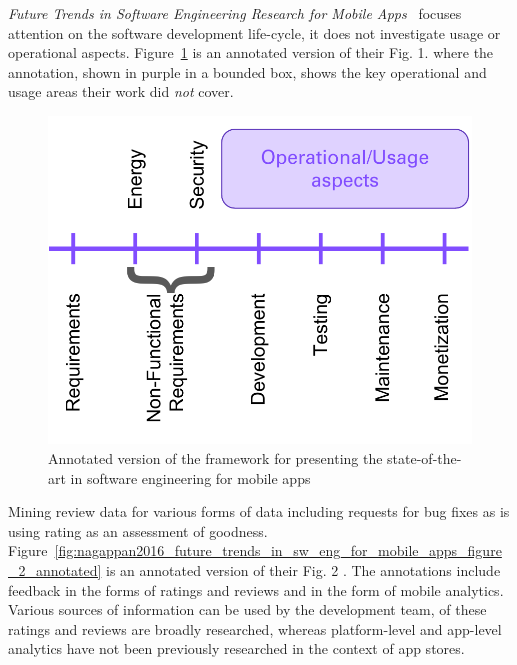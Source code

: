 \emph{Future Trends in Software Engineering Research for Mobile Apps}~ focuses attention on the software development life-cycle, it does not investigate usage or operational aspects. Figure~\ref{fig:nagappan2016_future_trends_in_sw_eng_for_mobile_apps_figure_1_annotated} is an annotated version of their Fig. 1.  where the annotation, shown in purple in a bounded box, shows the key operational and usage areas their work did \emph{not} cover. 


\begin{figure}
    \centering
    \includegraphics[width=\linewidth]{images/my/framework-for-presenting-the-state-of-the-art-in-sw-end-for-mobile-apps.pdf}
    \caption[Framework for presenting the state-of-the-art in software engineering for mobile apps, adapted from~\cite{nagappan2016_future_trends_in_sw_eng_for_mobile_apps}]{Annotated version of the framework for presenting the state-of-the-art in software engineering for mobile apps~\cite{nagappan2016_future_trends_in_sw_eng_for_mobile_apps}}
    \label{fig:nagappan2016_future_trends_in_sw_eng_for_mobile_apps_figure_1_annotated}
\end{figure}


Mining review data for various forms of data including requests for bug fixes as is using rating as an assessment of goodness. 
Figure~\ref{fig:nagappan2016_future_trends_in_sw_eng_for_mobile_apps_figure_2_annotated} is an annotated version of their Fig. 2 . The annotations include feedback in the forms of ratings and reviews and in the form of mobile analytics. Various sources of information can be used by the development team, of these ratings and reviews are broadly researched, whereas platform-level and app-level analytics have not been previously researched in the context of app stores.


